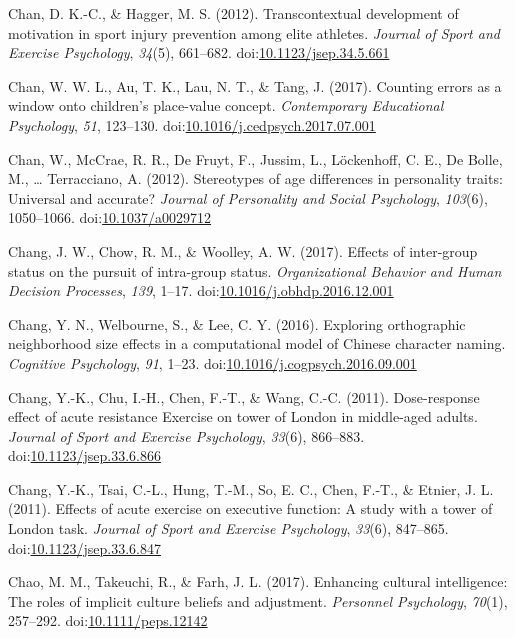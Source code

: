 \documentclass[english,man]{apa6}
\theoremstyle{definition}
\theoremstyle{definition}
\theoremstyle{definition}
\theoremstyle{remark}
\begin{document}
\hypertarget{ref-Chan2012a}{}
Chan, D. K.-C., \& Hagger, M. S. (2012). Transcontextual development of
motivation in sport injury prevention among elite athletes.
\emph{Journal of Sport and Exercise Psychology}, \emph{34}(5), 661--682.
doi:\href{https://doi.org/10.1123/jsep.34.5.661}{10.1123/jsep.34.5.661}

\hypertarget{ref-Chan2017}{}
Chan, W. W. L., Au, T. K., Lau, N. T., \& Tang, J. (2017). Counting
errors as a window onto children's place-value concept.
\emph{Contemporary Educational Psychology}, \emph{51}, 123--130.
doi:\href{https://doi.org/10.1016/j.cedpsych.2017.07.001}{10.1016/j.cedpsych.2017.07.001}

\hypertarget{ref-Chan2012}{}
Chan, W., McCrae, R. R., De Fruyt, F., Jussim, L., Löckenhoff, C. E., De
Bolle, M., \ldots{} Terracciano, A. (2012). Stereotypes of age
differences in personality traits: Universal and accurate? \emph{Journal
of Personality and Social Psychology}, \emph{103}(6), 1050--1066.
doi:\href{https://doi.org/10.1037/a0029712}{10.1037/a0029712}

\hypertarget{ref-Chang2017}{}
Chang, J. W., Chow, R. M., \& Woolley, A. W. (2017). Effects of
inter-group status on the pursuit of intra-group status.
\emph{Organizational Behavior and Human Decision Processes}, \emph{139},
1--17.
doi:\href{https://doi.org/10.1016/j.obhdp.2016.12.001}{10.1016/j.obhdp.2016.12.001}

\hypertarget{ref-Chang2016}{}
Chang, Y. N., Welbourne, S., \& Lee, C. Y. (2016). Exploring
orthographic neighborhood size effects in a computational model of
Chinese character naming. \emph{Cognitive Psychology}, \emph{91}, 1--23.
doi:\href{https://doi.org/10.1016/j.cogpsych.2016.09.001}{10.1016/j.cogpsych.2016.09.001}

\hypertarget{ref-Chang2011a}{}
Chang, Y.-K., Chu, I.-H., Chen, F.-T., \& Wang, C.-C. (2011).
Dose-response effect of acute resistance Exercise on tower of London in
middle-aged adults. \emph{Journal of Sport and Exercise Psychology},
\emph{33}(6), 866--883.
doi:\href{https://doi.org/10.1123/jsep.33.6.866}{10.1123/jsep.33.6.866}

\hypertarget{ref-Chang2011}{}
Chang, Y.-K., Tsai, C.-L., Hung, T.-M., So, E. C., Chen, F.-T., \&
Etnier, J. L. (2011). Effects of acute exercise on executive function: A
study with a tower of London task. \emph{Journal of Sport and Exercise
Psychology}, \emph{33}(6), 847--865.
doi:\href{https://doi.org/10.1123/jsep.33.6.847}{10.1123/jsep.33.6.847}

\hypertarget{ref-Chao2017}{}
Chao, M. M., Takeuchi, R., \& Farh, J. L. (2017). Enhancing cultural
intelligence: The roles of implicit culture beliefs and adjustment.
\emph{Personnel Psychology}, \emph{70}(1), 257--292.
doi:\href{https://doi.org/10.1111/peps.12142}{10.1111/peps.12142}
\end{document}
